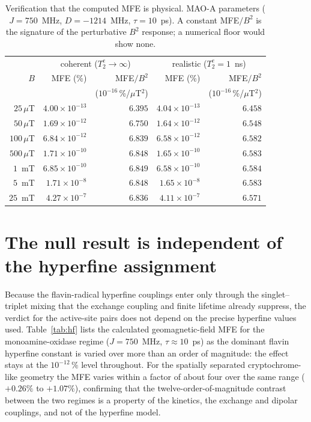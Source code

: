 \documentclass[11pt]{article}
\begin{document}
\begin{table}[h]
\centering
\caption{Verification that the computed MFE is physical. MAO-A parameters
($J = 750$~MHz, $D = -1214$~MHz, $\tau = 10$~ps). A constant MFE$/B^2$ is the
signature of the perturbative $B^2$ response; a numerical floor would show none.}
\label{tab:b2scaling}
\small
\begin{tabular}{r r r r r}
\hline
 & \multicolumn{2}{c}{coherent ($T_2^e\to\infty$)} & \multicolumn{2}{c}{realistic ($T_2^e = 1$~ns)} \\
$B$ & MFE (\%) & MFE$/B^2$ & MFE (\%) & MFE$/B^2$ \\
    &          & ($10^{-16}$\,\%/$\mu$T$^2$) &  & ($10^{-16}$\,\%/$\mu$T$^2$) \\
\hline
$25\,\mu$T  & $4.00\times10^{-13}$ & $6.395$ & $4.04\times10^{-13}$ & $6.458$ \\
$50\,\mu$T  & $1.69\times10^{-12}$ & $6.750$ & $1.64\times10^{-12}$ & $6.548$ \\
$100\,\mu$T & $6.84\times10^{-12}$ & $6.839$ & $6.58\times10^{-12}$ & $6.582$ \\
$500\,\mu$T & $1.71\times10^{-10}$ & $6.848$ & $1.65\times10^{-10}$ & $6.583$ \\
$1$~mT      & $6.85\times10^{-10}$ & $6.849$ & $6.58\times10^{-10}$ & $6.584$ \\
$5$~mT      & $1.71\times10^{-8}$  & $6.848$ & $1.65\times10^{-8}$  & $6.583$ \\
$25$~mT     & $4.27\times10^{-7}$  & $6.836$ & $4.11\times10^{-7}$  & $6.571$ \\
\hline
\end{tabular}
\end{table}

\section{The null result is independent of the hyperfine assignment}

Because the flavin-radical hyperfine couplings enter only through the
singlet--triplet mixing that the exchange coupling and finite lifetime already
suppress, the verdict for the active-site pairs does not depend on the precise
hyperfine values used. Table~\ref{tab:hf} lists the calculated geomagnetic-field
MFE for the monoamine-oxidase regime ($J = 750$~MHz, $\tau \approx 10$~ps) as the
dominant flavin hyperfine constant is varied over more than an order of
magnitude: the effect stays at the $10^{-12}\,\%$ level throughout. For the
spatially separated cryptochrome-like geometry the MFE varies within a factor of
about four over the same range ($+0.26\%$ to $+1.07\%$), confirming that the
twelve-order-of-magnitude contrast between the two regimes is a property of the
kinetics, the exchange and dipolar couplings, and not of the hyperfine model.
\end{document}
